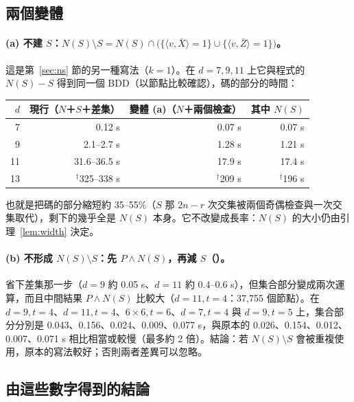 \documentclass[a4paper,11pt,fontset=none]{ctexart}
\newcommand{\code}[1]{\texttt{\detokenize{#1}}}
\theoremstyle{definition}
\begin{document}
\subsection{兩個變體}\label{sec:variants}

\paragraph{(a) 不建 $S$：$N(S)\setminus S=N(S)\cap\bigl(\{\langle v,\bar X\rangle=1\}\cup\{\langle v,\bar Z\rangle=1\}\bigr)$。}這是第~\ref{sec:ns} 節的另一種寫法（$k=1$）。在 $d=7,9,11$ 上它與程式的 $N(S)-S$ 得到同一個 BDD（以節點比較確認），碼的部分的時間：

\begin{center}
\small
\begin{tabular}{@{}rrrr@{}}
\toprule
$d$ & 現行（$N$＋$S$＋差集） & 變體 (a)（$N$＋兩個檢查） & 其中 $N(S)$\\
\midrule
7  & 0.12 s & 0.07 s & 0.07 s\\
9  & 2.1--2.7 s & 1.28 s & 1.21 s\\
11 & 31.6--36.5 s & 17.9 s & 17.4 s\\
13 & $^\dagger$325--338 s & $^\dagger$209 s & $^\dagger$196 s\\
\bottomrule
\end{tabular}
\end{center}
也就是把碼的部分縮短約 35--55\%（$S$ 那 $2n-r$ 次交集被兩個奇偶檢查與一次交集取代），剩下的幾乎全是 $N(S)$ 本身。它不改變成長率：$N(S)$ 的大小仍由引理~\ref{lem:width} 決定。

\paragraph{(b) 不形成 $N(S)\setminus S$：先 $P\wedge N(S)$，再減 $S$（\code{square-nf}）。}省下差集那一步（$d{=}9$ 約 0.05 s、$d{=}11$ 約 0.4--0.6 s），但集合部分變成兩次運算，而且中間結果 $P\wedge N(S)$ 比較大（$d{=}11,t{=}4$：37,755 個節點）。在 $d{=}9,t{=}4$、$d{=}11,t{=}4$、$6\times6,t{=}6$、$d{=}7,t{=}4$ 與 $d{=}9,t{=}5$ 上，集合部分分別是 0.043、0.156、0.024、0.009、0.077 s，與原本的 0.026、0.154、0.012、0.007、0.071 s 相比相當或較慢（最多約 2 倍）。結論：若 $N(S)\setminus S$ 會被重複使用，原本的寫法較好；否則兩者差異可以忽略。

\subsection{由這些數字得到的結論}
\end{document}
